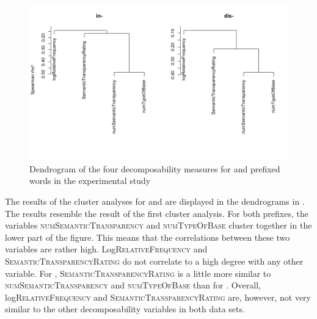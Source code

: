  
 

 

  \begin{figure} [b!]
  	\centering
  	\includegraphics[scale=0.5]{images/Experiment/clusterAnalysisDecomposabilityExpDisAndIn.png}
  	\caption{ Dendrogram of the four decomposability measures for  and prefixed words in the experimental study}
  	\label{fig:cluster experiment dis and in}
  \end{figure}
  
 The results of the cluster analyses for  and  are displayed in the dendrograms in . The results resemble the result of the first cluster analysis.
 For both prefixes, the variables \textsc{numSemanticTransparency} and \textsc{numTypeOfBase} cluster together in the lower part of the figure. This means that the correlations between these two variables are rather high. Log\textsc{RelativeFrequency} and \textsc{SemanticTransparencyRating} do not correlate to a high degree with any other variable.
 For , \textsc{SemanticTransparencyRating} is a little more similar to \textsc{numSemanticTransparency} and \textsc{numTypeOfBase} than for . 
 Overall, log\textsc{RelativeFrequency} and \textsc{SemanticTransparencyRating} are, however, not very similar to the other decomposability variables in both data sets. 

